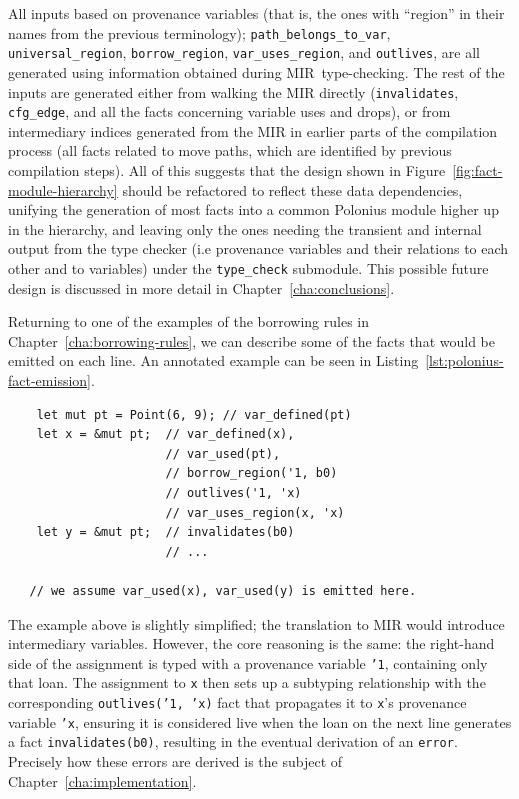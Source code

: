 \documentclass[11pt,a4paper,twoside,openany,draft]{report}
\newenvironment{sourcecode}{\captionsetup{type=listing}}{}
\newcommand{\InRust}[1]{\texttt{#1}}
\newcommand{\InDatalog}[1]{\texttt{#1}}
\begin{document}
All inputs based on provenance variables (that is, the ones with ``region'' in
their names from the previous terminology); \texttt{path\_belongs\_to\_var},
\texttt{universal\_region}, \texttt{borrow\_region}, \texttt{var\_uses\_region},
and \texttt{outlives}, are all generated using information obtained during
MIR~type-checking. The rest of the inputs are generated either from walking the
MIR directly (\texttt{invalidates}, \texttt{cfg\_edge}, and all the facts
concerning variable uses and drops), or from intermediary indices generated from
the MIR in earlier parts of the compilation process (all facts related to move
paths, which are identified by previous compilation steps). All of this suggests
that the design shown in Figure~\ref{fig:fact-module-hierarchy} should be
refactored to reflect these data dependencies, unifying the generation of most
facts into a common Polonius module higher up in the hierarchy, and leaving only
the ones needing the transient and internal output from the type checker (i.e
provenance variables and their relations to each other and to variables) under
the \texttt{type\_check} submodule. This possible future design is discussed in
more detail in Chapter~\ref{cha:conclusions}.

Returning to one of the examples of the borrowing rules in
Chapter~\ref{cha:borrowing-rules}, we can describe some of the facts that would
be emitted on each line. An annotated example can be seen in
Listing~\ref{lst:polonius-fact-emission}.

\begin{sourcecode}
  \label{lst:polonius-fact-emission}
\begin{verbatim}
    let mut pt = Point(6, 9); // var_defined(pt)
    let x = &mut pt;  // var_defined(x),
                      // var_used(pt),
                      // borrow_region('1, b0)
                      // outlives('1, 'x)
                      // var_uses_region(x, 'x)
    let y = &mut pt;  // invalidates(b0)
                      // ...

   // we assume var_used(x), var_used(y) is emitted here.
\end{verbatim}
\end{sourcecode}

The example above is slightly simplified; the translation to MIR would introduce
intermediary variables. However, the core reasoning is the same: the right-hand
side of the assignment is typed with a provenance variable \InRust{'1},
containing only that loan. The assignment to \InRust{x} then sets up a subtyping
relationship with the corresponding \InDatalog{outlives('1, 'x)} fact that
propagates it to \InRust{x}'s provenance variable \InRust{'x}, ensuring it is
considered live when the loan on the next line generates a fact
\InRust{invalidates(b0)}, resulting in the eventual derivation of an
\InRust{error}. Precisely how these errors are derived is the subject of
Chapter~\ref{cha:implementation}.
\end{document}
